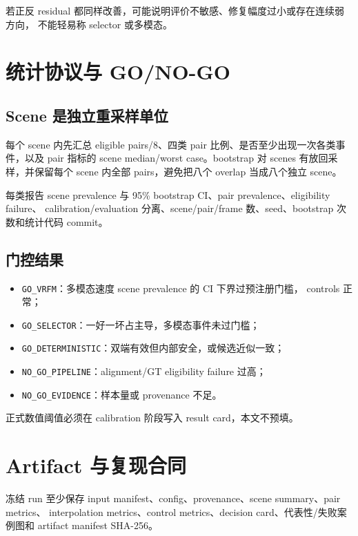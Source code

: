 \documentclass[UTF8,a4paper,11pt]{ctexart}
\begin{document}
若正反 residual 都同样改善，可能说明评价不敏感、修复幅度过小或存在连续弱方向，
不能轻易称 selector 或多模态。

\section{统计协议与 GO/NO-GO}

\subsection{Scene 是独立重采样单位}

每个 scene 内先汇总 eligible pairs/8、四类 pair 比例、是否至少出现一次各类事件，以及
pair 指标的 scene median/worst case。bootstrap 对 scenes 有放回采样，并保留每个
scene 内全部 pairs，避免把八个 overlap 当成八个独立 scene。

每类报告 scene prevalence 与 95\% bootstrap CI、pair prevalence、eligibility failure、
calibration/evaluation 分离、scene/pair/frame 数、seed、bootstrap 次数和统计代码 commit。

\subsection{门控结果}

\begin{itemize}
  \item \texttt{GO\_VRFM}：多模态速度 scene prevalence 的 CI 下界过预注册门槛，
    controls 正常；
  \item \texttt{GO\_SELECTOR}：一好一坏占主导，多模态事件未过门槛；
  \item \texttt{GO\_DETERMINISTIC}：双端有效但内部安全，或候选近似一致；
  \item \texttt{NO\_GO\_PIPELINE}：alignment/GT eligibility failure 过高；
  \item \texttt{NO\_GO\_EVIDENCE}：样本量或 provenance 不足。
\end{itemize}

正式数值阈值必须在 calibration 阶段写入 result card，本文不预填。

\section{Artifact 与复现合同}

冻结 run 至少保存 input manifest、config、provenance、scene summary、pair metrics、
interpolation metrics、control metrics、decision card、代表性/失败案例图和 artifact
manifest SHA-256。
\end{document}
